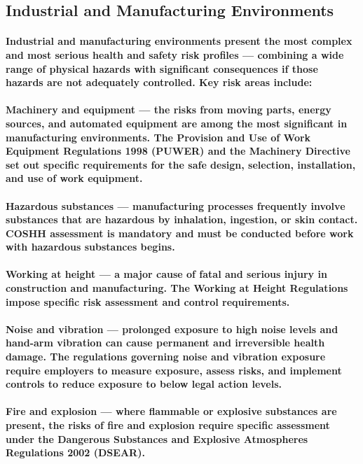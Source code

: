 \subsection{Industrial and Manufacturing Environments}
\paragraph{Industrial and manufacturing environments present the most complex and most serious health and safety risk profiles — combining a wide range of physical hazards with significant consequences if those hazards are not adequately controlled. Key risk areas include:}
\paragraph{\textbf{Machinery and equipment} — the risks from moving parts, energy sources, and automated equipment are among the most significant in manufacturing environments. The \textbf{Provision and Use of Work Equipment Regulations 1998 (PUWER)} and the \textbf{Machinery Directive} set out specific requirements for the safe design, selection, installation, and use of work equipment.}
\paragraph{\textbf{Hazardous substances} — manufacturing processes frequently involve substances that are hazardous by inhalation, ingestion, or skin contact. COSHH assessment is mandatory and must be conducted before work with hazardous substances begins.}
\paragraph{\textbf{Working at height} — a major cause of fatal and serious injury in construction and manufacturing. The Working at Height Regulations impose specific risk assessment and control requirements.}
\paragraph{\textbf{Noise and vibration} — prolonged exposure to high noise levels and hand-arm vibration can cause permanent and irreversible health damage. The regulations governing noise and vibration exposure require employers to measure exposure, assess risks, and implement controls to reduce exposure to below legal action levels.}
\paragraph{\textbf{Fire and explosion} — where flammable or explosive substances are present, the risks of fire and explosion require specific assessment under the \textbf{Dangerous Substances and Explosive Atmospheres Regulations 2002 (DSEAR)}.}

